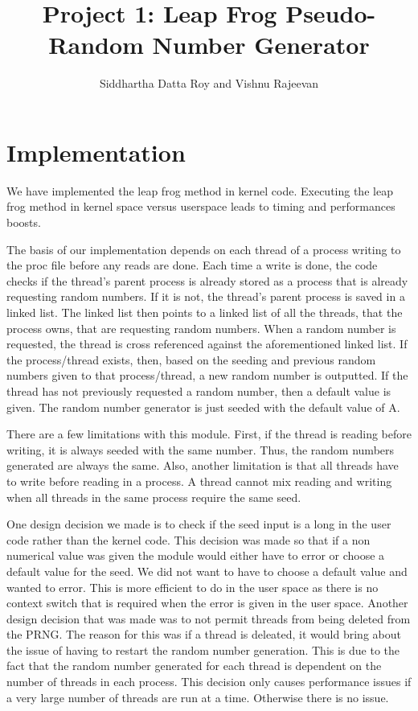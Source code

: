 \documentclass[12pt]{article}
\begin{document}
\title{Project 1: Leap Frog Pseudo-Random Number Generator}
\author{Siddhartha Datta Roy and Vishnu Rajeevan}
\maketitle
\newpage
\section*{Implementation}
	We have implemented the leap frog method in kernel code.
	Executing the leap frog method in kernel space versus userspace leads to timing and performances boosts.

	The basis of our implementation depends on each thread of a process writing to the proc file before any reads are done.
	Each time a write is done, the code checks if the thread's parent process is already stored as a process that is already requesting random numbers.
	If it is not, the thread's parent process is saved in a linked list.
	The linked list then points to a linked list of all the threads, that the process owns, that are requesting random numbers.
	When a random number is requested, the thread is cross referenced against the aforementioned linked list.
	If the process/thread exists, then, based on the seeding and previous random numbers given to that process/thread, a new random number is outputted.
	If the thread has not previously requested a random number, then a default value is given. 
	The random number generator is just seeded with the default value of A.

	There are a few limitations with this module. First, if the thread is reading before writing, it is always seeded with the same number. 
	Thus, the random numbers generated are always the same.
	Also, another limitation is that all threads have to write before reading in a process.
	A thread cannot mix reading and writing when all threads in the same process require the same seed.

	One design decision we made is to check if the seed input is a long in the user code rather than the kernel code.
	This decision was made so that if a non numerical value was given the module would either have to error or choose a default value for the seed.
	We did not want to have to choose a default value and wanted to error. 
	This is more efficient to do in the user space as there is no context switch that is required when the error is given in the user space.
	Another design decision that was made was to not permit threads from being deleted from the PRNG. 
	The reason for this was if a thread is deleated, it would bring about the issue of having to restart the random number generation.
	This is due to the fact that the random number generated for each thread is dependent on the number of threads in each process. 
	 This decision only causes performance issues if a very large number of threads are run at a time. Otherwise there is no issue.  
\end{document}
